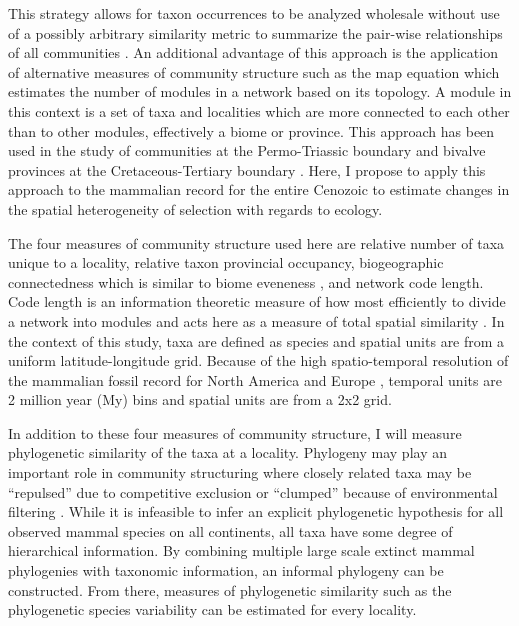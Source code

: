 \documentclass[11pt,letterpaper]{article}
\begin{document}
This strategy allows for taxon occurrences to be analyzed wholesale without use of a possibly arbitrary similarity metric to summarize the pair-wise relationships of all communities \citep{Sidor2013}. An additional advantage of this approach is the application of alternative measures of community structure such as the map equation \citep{Rosvall2008,Rosvall2009a} which estimates the number of modules in a network based on its topology. A module in this context is a set of taxa and localities which are more connected to each other than to other modules, effectively a biome or province. This approach has been used in the study of communities at the Permo-Triassic boundary \citep{Sidor2013} and bivalve provinces at the Cretaceous-Tertiary boundary \citep{Vilhena2013}. Here, I propose to apply this approach to the mammalian record for the entire Cenozoic to estimate changes in the spatial heterogeneity of selection with regards to ecology.

The four measures of community structure used here are relative number of taxa unique to a locality, relative taxon provincial occupancy, biogeographic connectedness which is similar to biome eveneness \citep{Sidor2013}, and network code length. Code length is an information theoretic measure of how most efficiently to divide a network into modules and acts here as a measure of total spatial similarity \citep{Rosvall2008,Rosvall2009a}. In the context of this study, taxa are defined as species and spatial units are from a uniform latitude-longitude grid. Because of the high spatio-temporal resolution of the mammalian fossil record for North America and Europe \citep{Alroy2009,Marcot2014,Fortelius2002,Jernvall2004}, temporal units are 2 million year (My) bins and spatial units are from a 2x2 grid.

In addition to these four measures of community structure, I will measure phylogenetic similarity of the taxa at a locality. Phylogeny may play an important role in community structuring where closely related taxa may be ``repulsed'' due to competitive exclusion or ``clumped'' because of environmental filtering \citep{Webb2002}. While it is infeasible to infer an explicit phylogenetic hypothesis for all observed mammal species on all continents, all taxa have some degree of hierarchical information. By combining multiple large scale extinct mammal phylogenies with taxonomic information, an informal phylogeny can be constructed. From there, measures of phylogenetic similarity such as the phylogenetic species variability \citep{Helmus2007a} can be estimated for every locality. 
\end{document}
